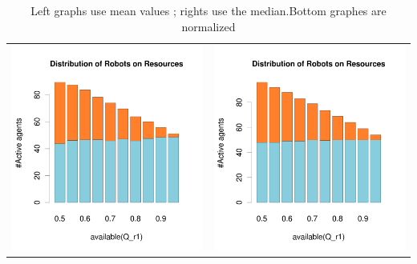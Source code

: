 \documentclass[a4paper,10pt]{article}
\begin{document}
\begin{table}[H]
\caption{Left graphs use mean values ; rights use the median.Bottom graphes are normalized}
\begin{tabular}{cc}

\includegraphics[width=\imgSize]{../images/5StaticEnv/barplotAliveR1AndR2_mean_env2}& \includegraphics[width=\imgSize]{../images/5StaticEnv/barplotAliveR1AndR2_median_env2}\\

\end{tabular}
\end{table}
\end{document}
